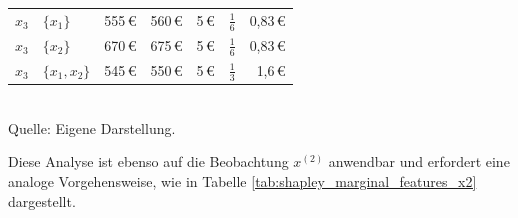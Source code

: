 \begin{table}[!h]
\begin{tabularx}{\textwidth}{XXrrrrr}
    $x_3$ & $\{x_1\}$ & 555\,\euro{} & 560\,\euro{} & 5\,\euro{} & $\frac{1}{6}$ & 0,83\,\euro{} \\
    $x_3$ & $\{x_2\}$ & 670\,\euro{} & 675\,\euro{} & 5\,\euro{} & $\frac{1}{6}$ & 0,83\,\euro{} \\
    $x_3$ & $\{x_1, x_2\}$ & 545\,\euro{} & 550\,\euro{} & 5\,\euro{} & $\frac{1}{3}$ & 1,6\,\euro{} \\
    \bottomrule
    \end{tabularx}
    \label{tab:shapley_marginal_features_x1}
    \normalsize\\
    Quelle: Eigene Darstellung.
\end{table}

Diese Analyse ist ebenso auf die Beobachtung $x^{(2)}$ anwendbar und erfordert eine analoge Vorgehensweise, 
wie in Tabelle \ref{tab:shapley_marginal_features_x2} dargestellt.

